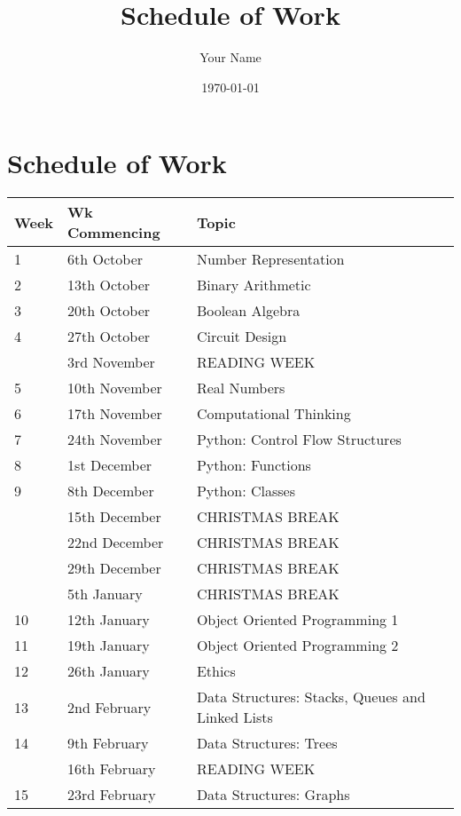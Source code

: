 \documentclass{article}
\title{Schedule of Work}
\author{Your Name}
\date{\today}
\begin{document}
\maketitle

\section{Schedule of Work}

\begin{table}[]
\begin{tabular}{| l | l | l |}
\hline
Week & Wk Commencing & Topic \\ \hline
1 & 6th October & Number Representation  \\ \hline
2 & 13th October & Binary Arithmetic  \\ \hline
3 & 20th October & Boolean Algebra \\ \hline
4 & 27th October & Circuit Design \\ \hline
  & 3rd November & READING WEEK \\ \hline
\rowcolor{green!25}
5 & 10th November & Real Numbers \\ \hline
6 & 17th November & Computational Thinking \\ \hline
7 & 24th November & Python: Control Flow Structures \\ \hline
8 & 1st December & Python: Functions \\ \hline
9 & 8th December & Python: Classes \\ \hline
\rowcolor{green!25}
 & 15th December & CHRISTMAS BREAK \\ \hline
\rowcolor{green!25}
 & 22nd December & CHRISTMAS BREAK \\ \hline
\rowcolor{green!25}
 & 29th December & CHRISTMAS BREAK \\ \hline
\rowcolor{green!25}
 & 5th January & CHRISTMAS BREAK \\ \hline
10 & 12th January & Object Oriented Programming 1 \\ \hline
11 & 19th January & Object Oriented Programming 2 \\ \hline
12 & 26th January & Ethics \\ \hline
13 & 2nd February & Data Structures: Stacks, Queues and Linked Lists \\ \hline
14 & 9th February & Data Structures: Trees \\ \hline
\rowcolor{green!25}
 & 16th February & READING WEEK \\ \hline
15 & 23rd February & Data Structures: Graphs \\ \hline

\end{tabular}
\end{table}
\end{document}
